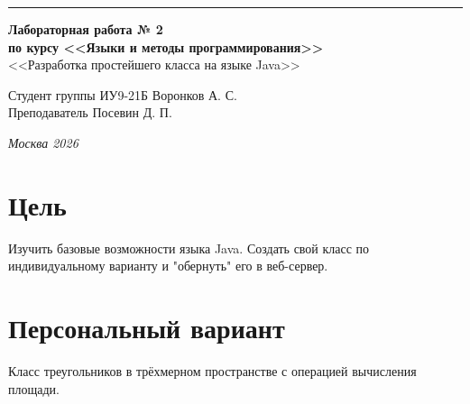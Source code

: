 \documentclass[a4paper, 14pt]{extarticle}
\begin{document}
\begin{titlepage}
\vspace*{-16pt}
\hspace{30pt}\rule{0.866\textwidth}{0.4pt}
  
\vspace{11em}

\begin{center}
\Large {\bf Лабораторная работа № 2} \\ 
\large {\bf по курсу <<Языки и методы программирования>>} \\ 
\large <<Разработка простейшего класса на языке Java>>
\end{center}\normalsize

\vspace{8em}


\begin{flushright}
  {Студент группы ИУ9-21Б Воронков А. С.\hspace*{15pt} \\
  \vspace{2ex}
  Преподаватель Посевин Д. П.\hspace*{15pt}}
\end{flushright}

\bigskip

\vfill
 

\begin{center}
\textsl{Москва 2026}
\end{center}
\end{titlepage}

\renewcommand{\ttdefault}{pcr}

\setlength{\tabcolsep}{3pt}
\newpage
\setcounter{page}{2}

\section{Цель}\label{Sect::task}
\par
Изучить базовые возможности языка Java. Создать свой класс по индивидуальному варианту и "обернуть" его в веб-сервер.
\section{Персональный вариант}
Класс треугольников в трёхмерном пространстве с операцией вычисления площади.
\pagebreak
\end{document}
